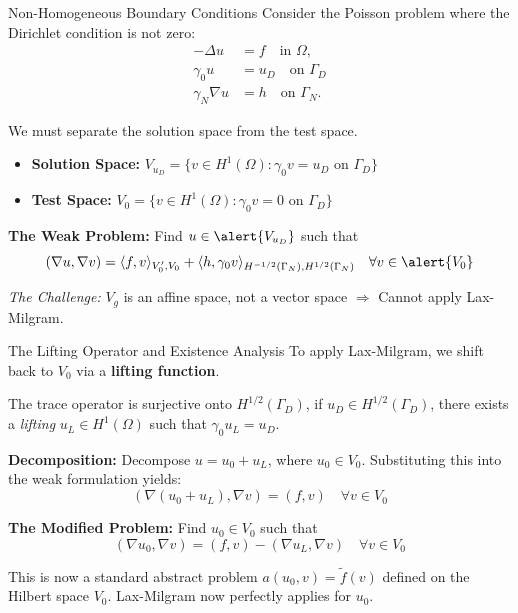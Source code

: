 \documentclass[aspectratio=169]{beamer}
\begin{document}
\begin{frame}{Non-Homogeneous Boundary Conditions}
    Consider the Poisson problem where the Dirichlet condition is not zero:
    \begin{align*}
        -\Delta u &= f \quad \text{in } \Omega, \\
        \gamma_0 u &= u_D \quad \text{on } \Gamma_D \\
        \gamma_N \nabla u &= h \quad \text{on } \Gamma_N.
    \end{align*}

    We must separate the solution space from the test space.
    \begin{itemize}
        \item \textbf{Solution Space:} $V_{u_D} = \{ v \in H^1(\Omega) : \gamma_0 v = u_D \text{ on } \Gamma_D \}$
        \item \textbf{Test Space:} $V_0 = \{ v \in H^1(\Omega) : \gamma_0 v = 0 \text{ on } \Gamma_D \}$
    \end{itemize}

    \vspace{0.3cm}
    \textbf{The Weak Problem:} Find $u \in \alert{V_{u_D}}$ such that
    $$ (\nabla u, \nabla v) = \langle f, v\rangle_{V_0', V_0} + \langle h, \gamma_0 v\rangle_{H^{-1/2}(\Gamma_N), H^{1/2}(\Gamma_N)}  \quad \forall v \in \alert{V_0} $$

    \vspace{0.2cm}
    \textit{The Challenge:} $V_g$ is an affine space, not a vector space $\Rightarrow$ Cannot apply Lax-Milgram.
\end{frame}

\begin{frame}{The Lifting Operator and Existence Analysis}
    To apply Lax-Milgram, we shift back to $V_0$ via a \textbf{lifting function}.

    \vspace{0.2cm}
    The trace operator is surjective onto $H^{1/2}(\Gamma_D)$, if $u_D \in H^{1/2}(\Gamma_D)$, there exists a \emph{lifting} $u_L \in H^1(\Omega)$ such that $\gamma_0 u_L = u_D$.

    \vspace{0.2cm}
    \textbf{Decomposition:} Decompose $u = u_0 + u_L$, where $u_0 \in V_0$. Substituting this into the weak formulation yields:
    $$ (\nabla(u_0 + u_L), \nabla v) = (f, v) \quad \forall v \in V_0 $$

    \vspace{0.2cm}
    \textbf{The Modified Problem:} Find $u_0 \in V_0$ such that
    $$ (\nabla u_0, \nabla v) = (f, v) - (\nabla u_L, \nabla v) \quad \forall v \in V_0 $$

    \vspace{0.2cm}
    This is now a standard abstract problem $a(u_0, v) = \tilde{f}(v)$ defined on the Hilbert space $V_0$. Lax-Milgram now perfectly applies for $u_0$.
\end{frame}
\end{document}
